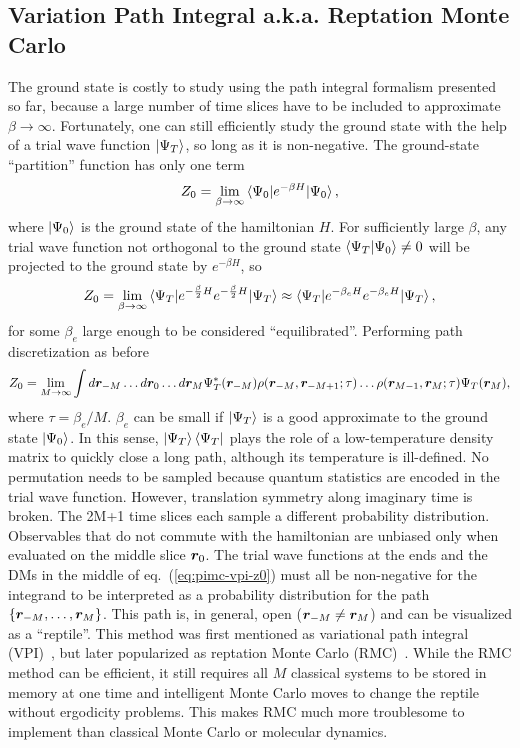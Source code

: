 \subsection{Variation Path Integral a.k.a. Reptation Monte Carlo}
The ground state is costly to study using the path integral formalism presented so far, because a large number of time slices have to be included to approximate $\beta\rightarrow\infty$. Fortunately, one can still efficiently study the ground state with the help of a trial wave function $\ket{\Psi_T}$, so long as it is non-negative. The ground-state ``partition'' function has only one term
\begin{align}
Z_0 = \lim\limits_{\beta\rightarrow\infty} \braket{\Psi_0|e^{-\beta H}|\Psi_0},
\end{align}
where $\ket{\Psi_0}$ is the ground state of the hamiltonian $H$.
For sufficiently large $\beta$, any trial wave function not orthogonal to the ground state $\braket{\Psi_T|\Psi_0}\neq0$ will be projected to the ground state by $e^{-\beta H}$, so
\begin{align} \label{eq:rmc-z0}
Z_0 = \lim\limits_{\beta\rightarrow\infty}\braket{\Psi_T|e^{-\frac{\beta}{2} H}e^{-\frac{\beta}{2} H}|\Psi_T} \approx \braket{\Psi_T|e^{-\beta_e H}e^{-\beta_e H}|\Psi_T},
\end{align}
for some $\beta_e$ large enough to be considered ``equilibrated''. Performing path discretization as before
\begin{align} \label{eq:pimc-vpi-z0}
Z_0 = \lim\limits_{M\rightarrow\infty} \int d\boldsymbol{r}_{-M}\dots d\boldsymbol{r}_0\dots d\boldsymbol{r}_{M}
\Psi_T^*(\boldsymbol{r}_{-M})\rho(\boldsymbol{r}_{-M},\boldsymbol{r}_{-M+1};\tau)\dots\rho(\boldsymbol{r}_{M-1},\boldsymbol{r}_M;\tau)\Psi_T(\boldsymbol{r}_M),
\end{align}
where $\tau=\beta_e/M$. $\beta_e$ can be small if $\ket{\Psi_T}$ is a good approximate to the ground state $\ket{\Psi_0}$. In this sense, $\ket{\Psi_T}\bra{\Psi_T}$ plays the role of a low-temperature density matrix to quickly close a long path, although its temperature is ill-defined. No permutation needs to be sampled because quantum statistics are encoded in the trial wave function. However, translation symmetry along imaginary time is broken. The 2M+1 time slices each sample a different probability distribution. Observables that do not commute with the hamiltonian are unbiased only when evaluated on the middle slice $\boldsymbol{r}_0$. The trial wave functions at the ends and the DMs in the middle of eq.~(\ref{eq:pimc-vpi-z0}) must all be non-negative for the integrand to be interpreted as a probability distribution for the path $\{\boldsymbol{r}_{-M},\dots,\boldsymbol{r}_M\}$. This path is, in general, open ($\boldsymbol{r}_{-M}\neq\boldsymbol{r}_M$) and can be visualized as a ``reptile''. This method was first mentioned as variational path integral (VPI)~\cite{Ceperley1995}, but later popularized as reptation Monte Carlo (RMC)~\cite{Baroni1999}. While the RMC method can be efficient, it still requires all $M$ classical systems to be stored in memory at one time and intelligent Monte Carlo moves to change the reptile without ergodicity problems. This makes RMC much more troublesome to implement than classical Monte Carlo or molecular dynamics.

